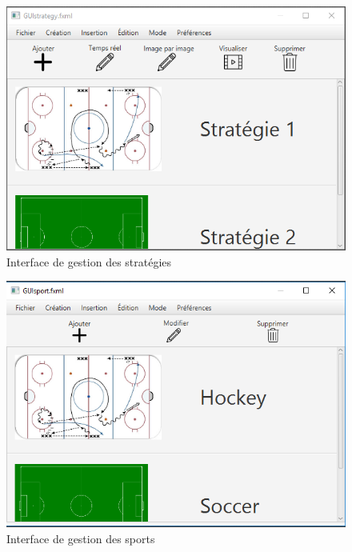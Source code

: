 \begin{figure}[htpb]
    \centering
    \includegraphics[scale=0.6]{fig/gui/gui_strategie.png}
    \caption{Interface de gestion des stratégies}
    \label{fig:gui:gui_strategie}
\end{figure}

\begin{figure}[htpb]
    \centering
    \includegraphics[scale=0.6]{fig/gui/gui_sport.png}
    \caption{Interface de gestion des sports}
    \label{fig:gui:gui_sport}
\end{figure}


